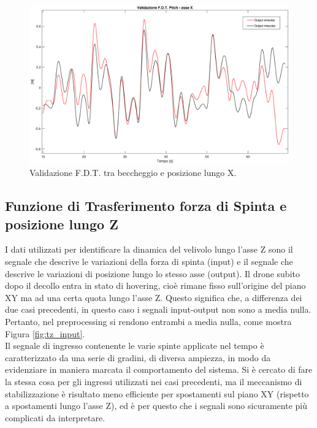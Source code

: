 \begin{figure}[H]
	\centering
	\includegraphics[width=1\textwidth]{gfx/SysId/pxmodel}
	\caption[Validazione F.D.T. Beccheggio e posizione lungo X.]{Validazione F.D.T. tra beccheggio e posizione lungo X.}
	\label{fig:px_model}
\end{figure}

\subsection{Funzione di Trasferimento forza di Spinta e posizione lungo Z}
I dati utilizzati per identificare la dinamica del velivolo lungo l'asse Z sono il segnale che descrive le variazioni della forza di spinta (input) e il segnale che descrive le variazioni di posizione lungo lo stesso asse (output). Il drone subito dopo il decollo entra in stato di hovering, cioè rimane fisso sull'origine del piano XY ma ad una certa quota lungo l'asse Z. Questo significa che, a differenza dei due casi precedenti, in questo caso i segnali input-output non sono a media nulla. Pertanto, nel preprocessing si rendono entrambi a media nulla, come mostra Figura \ref{fig:tz_input}.\\

Il segnale di ingresso contenente le varie spinte applicate nel tempo è caratterizzato da una serie di gradini, di diversa ampiezza, in modo da evidenziare in maniera marcata il comportamento del sistema. Si è cercato di fare la stessa cosa per gli ingressi utilizzati nei casi precedenti, ma il meccanismo di stabilizzazione è risultato meno efficiente per spostamenti sul piano XY (rispetto a spostamenti lungo l'asse Z), ed è per questo che i segnali sono sicuramente più complicati da interpretare.

